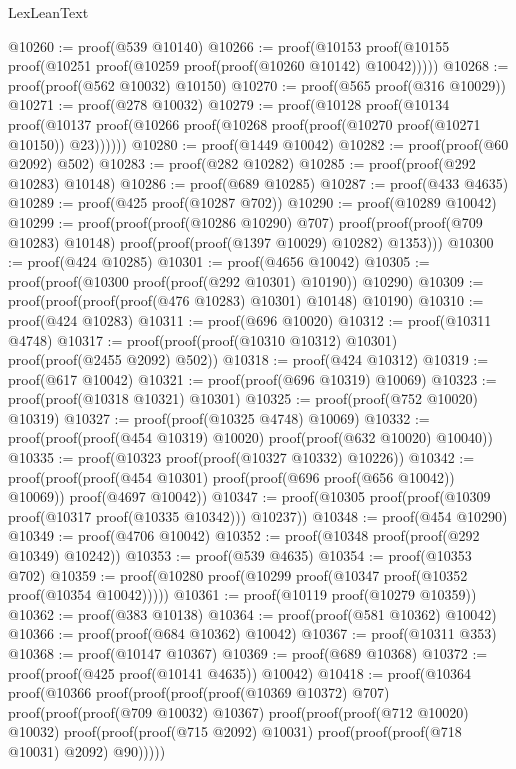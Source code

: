 \begin{lexlean}{LexLeanText}
\begin{coremodule}
@10260 := proof(@539 @10140)
@10266 := proof(@10153 proof(@10155 proof(@10251 proof(@10259 proof(proof(@10260 @10142) @10042)))))
@10268 := proof(proof(@562 @10032) @10150)
@10270 := proof(@565 proof(@316 @10029))
@10271 := proof(@278 @10032)
@10279 := proof(@10128
      proof(@10134
          proof(@10137 proof(@10266 proof(@10268 proof(proof(@10270 proof(@10271 @10150)) @23))))))
@10280 := proof(@1449 @10042)
@10282 := proof(proof(@60 @2092) @502)
@10283 := proof(@282 @10282)
@10285 := proof(proof(@292 @10283) @10148)
@10286 := proof(@689 @10285)
@10287 := proof(@433 @4635)
@10289 := proof(@425 proof(@10287 @702))
@10290 := proof(@10289 @10042)
@10299 := proof(proof(proof(@10286 @10290) @707)
      proof(proof(proof(@709 @10283) @10148) proof(proof(proof(@1397 @10029) @10282) @1353)))
@10300 := proof(@424 @10285)
@10301 := proof(@4656 @10042)
@10305 := proof(proof(@10300 proof(proof(@292 @10301) @10190)) @10290)
@10309 := proof(proof(proof(proof(@476 @10283) @10301) @10148) @10190)
@10310 := proof(@424 @10283)
@10311 := proof(@696 @10020)
@10312 := proof(@10311 @4748)
@10317 := proof(proof(proof(@10310 @10312) @10301) proof(proof(@2455 @2092) @502))
@10318 := proof(@424 @10312)
@10319 := proof(@617 @10042)
@10321 := proof(proof(@696 @10319) @10069)
@10323 := proof(proof(@10318 @10321) @10301)
@10325 := proof(proof(@752 @10020) @10319)
@10327 := proof(proof(@10325 @4748) @10069)
@10332 := proof(proof(proof(@454 @10319) @10020) proof(proof(@632 @10020) @10040))
@10335 := proof(@10323 proof(proof(@10327 @10332) @10226))
@10342 := proof(proof(proof(@454 @10301) proof(proof(@696 proof(@656 @10042)) @10069))
      proof(@4697 @10042))
@10347 := proof(@10305 proof(proof(@10309 proof(@10317 proof(@10335 @10342))) @10237))
@10348 := proof(@454 @10290)
@10349 := proof(@4706 @10042)
@10352 := proof(@10348 proof(proof(@292 @10349) @10242))
@10353 := proof(@539 @4635)
@10354 := proof(@10353 @702)
@10359 := proof(@10280 proof(@10299 proof(@10347 proof(@10352 proof(@10354 @10042)))))
@10361 := proof(@10119 proof(@10279 @10359))
@10362 := proof(@383 @10138)
@10364 := proof(proof(@581 @10362) @10042)
@10366 := proof(proof(@684 @10362) @10042)
@10367 := proof(@10311 @353)
@10368 := proof(@10147 @10367)
@10369 := proof(@689 @10368)
@10372 := proof(proof(@425 proof(@10141 @4635)) @10042)
@10418 := proof(@10364
      proof(@10366
          proof(proof(proof(proof(@10369 @10372) @707)
                proof(proof(proof(@709 @10032) @10367)
                    proof(proof(proof(@712 @10020) @10032)
                        proof(proof(proof(@715 @2092) @10031)
                            proof(proof(proof(@718 @10031) @2092) @90)))))

\end{coremodule}
\end{lexlean}
